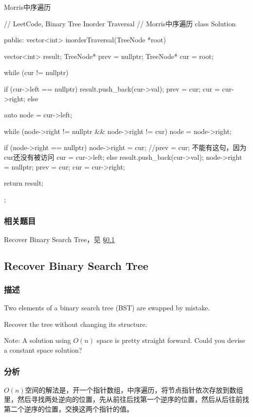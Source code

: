 Morris中序遍历
\begin{Code}
// LeetCode, Binary Tree Inorder Traversal
// Morris中序遍历
class Solution {
public:
    vector<int> inorderTraversal(TreeNode *root) {
        vector<int> result;
        TreeNode* prev = nullptr;
        TreeNode* cur = root;

        while (cur != nullptr) {
            if (cur->left == nullptr) {
                result.push_back(cur->val);
                prev = cur;
                cur = cur->right;
            } else {
                auto node = cur->left;

                while (node->right != nullptr && node->right != cur)
                    node = node->right;

                if (node->right == nullptr) {
                    node->right = cur;
                    //prev = cur; 不能有这句，因为cur还没有被访问
                    cur = cur->left;
                } else {
                    result.push_back(cur->val);
                    node->right = nullptr;
                    prev = cur;
                    cur = cur->right;
                }
            }
        }
        return result;
    }
};
\end{Code}


\subsubsection{相关题目}
\begindot
\item Recover Binary Search Tree，见 \S \ref{sec:recover-binary-search-tree}
\myenddot


\subsection{Recover Binary Search Tree}
\label{sec:recover-binary-search-tree}


\subsubsection{描述}
Two elements of a binary search tree (BST) are swapped by mistake.

Recover the tree without changing its structure.

Note: A solution using $O(n)$ space is pretty straight forward. Could you devise a constant space solution?


\subsubsection{分析}
$O(n)$空间的解法是，开一个指针数组，中序遍历，将节点指针依次存放到数组里，然后寻找两处逆向的位置，先从前往后找第一个逆序的位置，然后从后往前找第二个逆序的位置，交换这两个指针的值。

